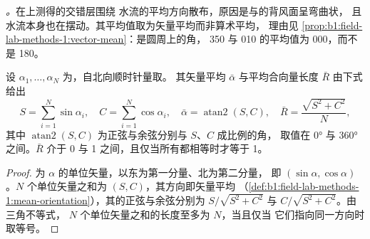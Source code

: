 \emph{。}在上测得的交错层围绕
水流的平均方向散布，原因是与的背风面呈弯曲状，
且水流本身也在摆动。其平均值取为矢量平均而非算术平均，
理由见
\cref{prop:b1:field-lab-methods-1:vector-mean}：是圆周上的角，
350 与 010 的平均值为 000，而不是 180。

\begin{proposition}[方位角的平均]\label{prop:b1:clastic-sediments:azimuths}
设 $\alpha_1, \ldots, \alpha_N$ 为，自北向顺时针量取。
其矢量平均 $\bar\alpha$ 与平均合向量长度 $\bar R$
由下式给出
\[
  S = \sum_{i=1}^N \sin\alpha_i, \quad C = \sum_{i=1}^N \cos\alpha_i, \quad
  \bar\alpha = \operatorname{atan2}(S, C), \quad \bar R = \frac{\sqrt{S^2 + C^2}}{N},
\]
其中 $\operatorname{atan2}(S, C)$ 为正弦与余弦分别与 $S$、$C$ 成比例的角，
取值在 \ang{0} 与 \ang{360} 之间。$\bar R$ 介于
0 与 1 之间，且仅当所有都相等时才等于 1。
\end{proposition}

\begin{proof}
为 $\alpha$ 的单位矢量，以东为第一分量、北为第二分量，
即 $(\sin\alpha, \cos\alpha)$。$N$ 个单位矢量之和为
$(S, C)$，其方向即矢量平均
（\cref{def:b1:field-lab-methods-1:mean-orientation}），其的正弦与余弦分别为
$S/\sqrt{S^2+C^2}$ 与 $C/\sqrt{S^2+C^2}$。由三角不等式，
$N$ 个单位矢量之和的长度至多为 $N$，当且仅当
它们指向同一方向时取等号。
\end{proof}


